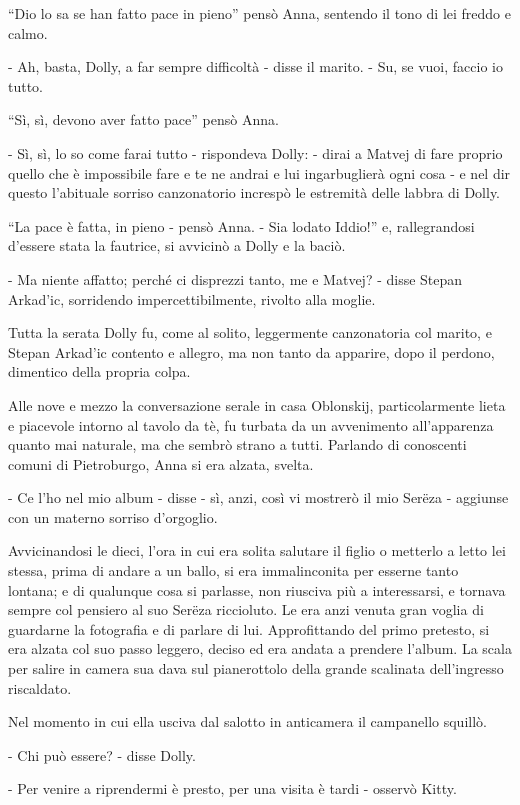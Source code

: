 ``Dio lo sa se han fatto pace in pieno'' pensò Anna, sentendo il tono di lei freddo e calmo. 

- Ah, basta, Dolly, a far sempre difficoltà - disse il marito. - Su, se vuoi, faccio io tutto. 

``Sì, sì, devono aver fatto pace'' pensò Anna. 

- Sì, sì, lo so come farai tutto - rispondeva Dolly: - dirai a Matvej di fare proprio quello che è impossibile fare e te ne andrai e lui ingarbuglierà ogni cosa - e nel dir questo l'abituale sorriso canzonatorio increspò le estremità delle labbra di Dolly. 

``La pace è fatta, in pieno - pensò Anna. - Sia lodato Iddio!'' e, rallegrandosi d'essere stata la fautrice, si avvicinò a Dolly e la baciò. 

- Ma niente affatto; perché ci disprezzi tanto, me e Matvej? - disse Stepan Arkad'ic, sorridendo impercettibilmente, rivolto alla moglie. 

Tutta la serata Dolly fu, come al solito, leggermente canzonatoria col marito, e Stepan Arkad'ic contento e allegro, ma non tanto da apparire, dopo il perdono, dimentico della propria colpa. 

Alle nove e mezzo la conversazione serale in casa Oblonskij, particolarmente lieta e piacevole intorno al tavolo da tè, fu turbata da un avvenimento all'apparenza quanto mai naturale, ma che sembrò strano a tutti. Parlando di conoscenti comuni di Pietroburgo, Anna si era alzata, svelta. 

- Ce l'ho nel mio album - disse - sì, anzi, così vi mostrerò il mio Serëza - aggiunse con un materno sorriso d'orgoglio. 

Avvicinandosi le dieci, l'ora in cui era solita salutare il figlio o metterlo a letto lei stessa, prima di andare a un ballo, si era immalinconita per esserne tanto lontana; e di qualunque cosa si parlasse, non riusciva più a interessarsi, e tornava sempre col pensiero al suo Serëza riccioluto. Le era anzi venuta gran voglia di guardarne la fotografia e di parlare di lui. Approfittando del primo pretesto, si era alzata col suo passo leggero, deciso ed era andata a prendere l'album. La scala per salire in camera sua dava sul pianerottolo della grande scalinata dell'ingresso riscaldato. 

Nel momento in cui ella usciva dal salotto in anticamera il campanello squillò. 

- Chi può essere? - disse Dolly. 

- Per venire a riprendermi è presto, per una visita è tardi - osservò Kitty. 

